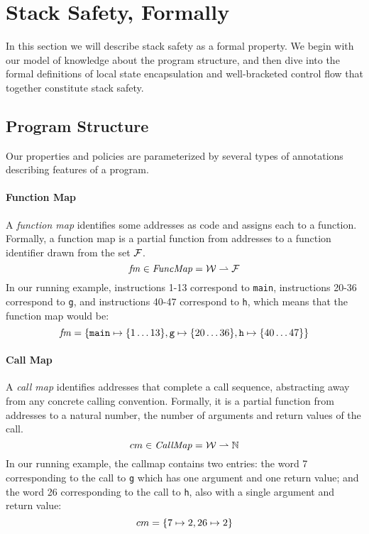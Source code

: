 \documentclass[acmsmall,review,anonymous]{acmart}\settopmatter{printfolios=true,printccs=false,printacmref=false}
\begin{document}
\section{Stack Safety, Formally}
\label{sec:lse-and-wbcf}

In this section we will describe stack safety as a formal property. We
begin with our model of  knowledge about the
program structure, and then dive into the formal definitions of local state
encapsulation and well-bracketed control flow that together constitute
stack safety.

\subsection{Program Structure}

Our properties and policies are parameterized by several types of
annotations describing features of a program.

\paragraph*{Function Map}

A {\em function map} identifies some addresses as code and assigns
each to a function. Formally, a function map is a
partial function from addresses to a function
identifier drawn from the set \(\mathcal{F}\).
\[\mathit{fm} \in \mathit{FuncMap} = {\mathcal W} \rightharpoonup \mathcal{F}\]
%
In our running example, instructions 1-13 correspond to {\tt main},
instructions 20-36 correspond to {\tt g}, and instructions 40-47
correspond to {\tt h}, which means that the function map would be:
\[ \mathit{fm} = \{\texttt{main} \mapsto \{1\ldots13\}, \texttt{g} \mapsto \{20\ldots36\}, \texttt{h} \mapsto \{40\ldots47\}\}\]

\paragraph*{Call Map}

A {\em call map} identifies addresses that complete a call sequence,
abstracting away from any concrete calling convention. Formally, it is
a partial function from addresses to a natural number, the number of
arguments and return values of the call.
\[cm \in \mathit{CallMap} = {\mathcal W} \rightharpoonup \mathbb{N}\]
%
In our running example, the callmap contains two entries: the word 7
corresponding to the call to {\tt g} which has one argument and one
return value; and the word 26 corresponding to the call to {\tt h},
also with a single argument and return value:
\[ cm = \{ 7 \mapsto 2, 26 \mapsto 2\}\]
\end{document}
